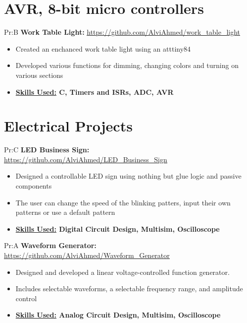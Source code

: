 \begin{itemize}
\section*{AVR, 8-bit micro controllers}


Pr:B
\vspace{\spaces}
\textbf{Work Table Light: }
\underline{\url{https://github.com/AlviAhmed/work_table_light}}
\begin{itemize}[noitemsep,nolistsep]
\item Created an enchanced work table light using an atttiny84
\item Developed various functions for dimming, changing colors and turning on various sections 
\item \textbf{ \underline{Skills Used:} C, Timers and ISRs, ADC, AVR}
\end{itemize}


\section*{Electrical Projects}


Pr:C
\textbf{LED Business Sign: }
\underline{\url{https://github.com/AlviAhmed/LED_Business_Sign}}
\begin{itemize}[noitemsep,nolistsep]
\item Designed a controllable LED sign using nothing but glue logic and passive components
\item The user can change the speed of the blinking patters, input their own patterns or
  use a default pattern
\item \textbf{ \underline{Skills Used:} Digital Circuit Design, Multisim, Oscilloscope}
\end{itemize}


Pr:A
\textbf{Waveform Generator: }
\underline{\url{https://github.com/AlviAhmed/Waveform_Generator}}
\begin{itemize}[noitemsep,nolistsep]
\item Designed and developed a linear voltage-controlled function generator. 
\item Includes selectable waveforms, a selectable frequency range, and amplitude control
\item \textbf{ \underline{Skills Used:} Analog Circuit Design, Multisim, Oscilloscope}
\end{itemize}            



\end{itemize}
